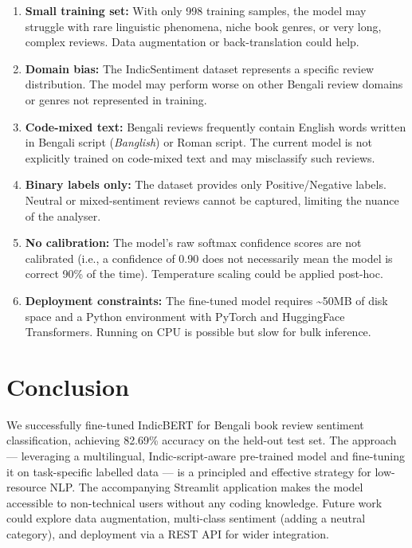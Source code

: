 \documentclass[11pt,a4paper]{article}
\begin{document}
\begin{enumerate}
    \item \textbf{Small training set:} With only 998 training samples, the model may struggle with rare linguistic phenomena, niche book genres, or very long, complex reviews. Data augmentation or back-translation could help.

    \item \textbf{Domain bias:} The IndicSentiment dataset represents a specific review distribution. The model may perform worse on other Bengali review domains or genres not represented in training.

    \item \textbf{Code-mixed text:} Bengali reviews frequently contain English words written in Bengali script (\textit{Banglish}) or Roman script. The current model is not explicitly trained on code-mixed text and may misclassify such reviews.

    \item \textbf{Binary labels only:} The dataset provides only Positive/Negative labels. Neutral or mixed-sentiment reviews cannot be captured, limiting the nuance of the analyser.

    \item \textbf{No calibration:} The model's raw softmax confidence scores are not calibrated (i.e., a confidence of 0.90 does not necessarily mean the model is correct 90\% of the time). Temperature scaling could be applied post-hoc.

    \item \textbf{Deployment constraints:} The fine-tuned model requires \textasciitilde{}50MB of disk space and a Python environment with PyTorch and HuggingFace Transformers. Running on CPU is possible but slow for bulk inference.
\end{enumerate}

\section{Conclusion}

We successfully fine-tuned IndicBERT for Bengali book review sentiment classification, achieving 82.69\% accuracy on the held-out test set. The approach — leveraging a multilingual, Indic-script-aware pre-trained model and fine-tuning it on task-specific labelled data — is a principled and effective strategy for low-resource NLP. The accompanying Streamlit application makes the model accessible to non-technical users without any coding knowledge. Future work could explore data augmentation, multi-class sentiment (adding a neutral category), and deployment via a REST API for wider integration.
\end{document}
